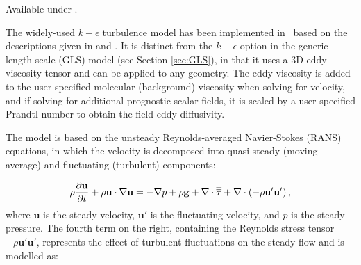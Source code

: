 Available under .

The widely-used $k-\epsilon$ turbulence model has been implemented in \fluidity\ based on
the descriptions given in \citet{wilcox1998turbulence} and \citet{Rodi1993}. It is
distinct from the $k-\epsilon$ option in the generic length scale (GLS) model (see Section
\ref{sec:GLS}), in that it uses a 3D eddy-viscosity tensor and can be applied to any
geometry. The eddy viscosity is added to the user-specified molecular (background)
viscosity when solving for velocity, and if solving for additional prognostic scalar
fields, it is scaled by a user-specified Prandtl number to obtain the field eddy
diffusivity.

The model is based on the unsteady Reynolds-averaged Navier-Stokes (RANS) equations, in
which the velocity is decomposed into quasi-steady (moving average) and fluctuating
(turbulent) components:


\begin{equation}\label{eq:RANS}
  \rho\frac{\partial \mathbf{u}}{\partial t} + \rho\mathbf{u}\cdot\nabla\mathbf{u} =
  -\nabla p + \rho\mathbf{g} + \nabla\cdot\overline{\overline{\tau}} + \nabla\cdot\left(-\rho\mathbf{u}'\mathbf{u}'\right),
\end{equation}
where $\mathbf{u}$ is the steady velocity, $\mathbf{u}'$ is the fluctuating velocity, and
$p$ is the steady pressure.  The fourth term on the right, containing the Reynolds stress
tensor $-\rho\mathbf{u}'\mathbf{u}'$, represents the effect of turbulent fluctuations on
the steady flow and is modelled as:

